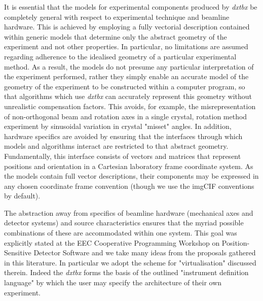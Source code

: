 \documentclass[preprint]{iucr}
\newcommand{\dxtbx}{\emph{dxtbx}\xspace}
\begin{document}
It is essential that the models for experimental components produced by \dxtbx be 
completely general with respect to experimental technique and beamline hardware. 
This is achieved by employing a fully vectorial description contained within 
generic models that determine only the abstract geometry of the experiment and 
not other properties. In particular, no limitations are assumed regarding 
adherence to the idealised geometry of a particular experimental method. As a 
result, the models do not presume any particular interpretation of the 
experiment performed, rather they simply enable an accurate model of the 
geometry of the experiment to be constructed within a computer program, so that 
algorithms which use \dxtbx can accurately represent this geometry without 
unrealistic compensation factors. This avoids, for example, the 
misrepresentation of non-orthogonal beam and rotation axes in a single crystal, 
rotation method experiment by sinusoidal variation in crystal "misset" angles. 
In addition, hardware specifics are avoided by ensuring that the interfaces 
through which models and algorithms interact are restricted to that abstract 
geometry. Fundamentally, this interface consists of vectors and matrices that 
represent positions and orientation in a Cartesian laboratory frame coordinate 
system. As the models contain full vector descriptions, their components may be 
expressed in any chosen coordinate frame convention (though we use the imgCIF 
conventions by default). 

The abstraction away from specifics of beamline hardware (mechanical axes and 
detector systems) and source characteristics ensures that the myriad possible 
combinations of these are accommodated within one system. This goal was 
explicitly stated at the EEC Cooperative Programming Workshop on Position-Sensitive 
Detector Software \cite{Bricogne1987} and we take many ideas from the proposals gathered 
in this literature. In particular we adopt the scheme for "virtualisation" discussed 
therein. Indeed the \dxtbx forms the basis of the outlined "instrument definition 
language" by which the user may specify the architecture of their own experiment. 
\end{document}
